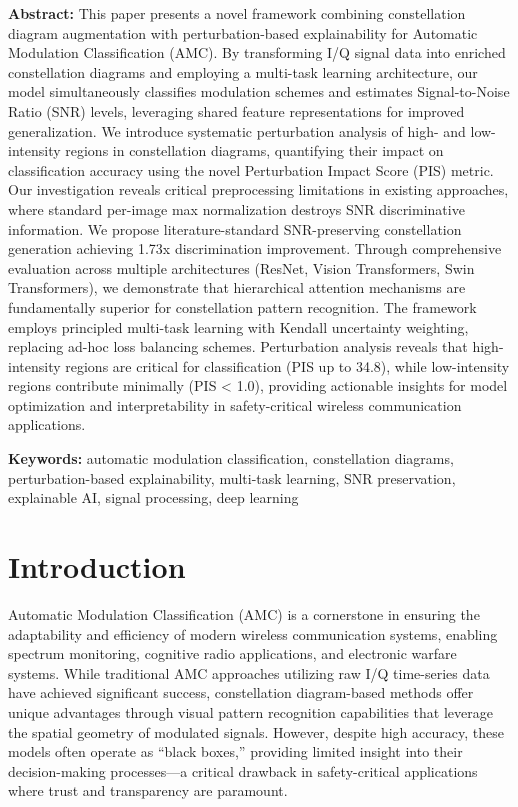 \documentclass{ELSP}
\begin{document}
\noindent\textbf{\textbf{\textcolor[RGB]{0,131,255}{Abstract:}}} This paper presents a novel framework combining constellation diagram augmentation with perturbation-based explainability for Automatic Modulation Classification (AMC). By transforming I/Q signal data into enriched constellation diagrams and employing a multi-task learning architecture, our model simultaneously classifies modulation schemes and estimates Signal-to-Noise Ratio (SNR) levels, leveraging shared feature representations for improved generalization. We introduce systematic perturbation analysis of high- and low-intensity regions in constellation diagrams, quantifying their impact on classification accuracy using the novel Perturbation Impact Score (PIS) metric. Our investigation reveals critical preprocessing limitations in existing approaches, where standard per-image max normalization destroys SNR discriminative information. We propose literature-standard SNR-preserving constellation generation achieving 1.73x discrimination improvement. Through comprehensive evaluation across multiple architectures (ResNet, Vision Transformers, Swin Transformers), we demonstrate that hierarchical attention mechanisms are fundamentally superior for constellation pattern recognition. The framework employs principled multi-task learning with Kendall uncertainty weighting, replacing ad-hoc loss balancing schemes. Perturbation analysis reveals that high-intensity regions are critical for classification (PIS up to 34.8), while low-intensity regions contribute minimally (PIS < 1.0), providing actionable insights for model optimization and interpretability in safety-critical wireless communication applications.

\noindent\textbf{\textcolor[RGB]{0,131,255}{Keywords:}} automatic modulation classification, constellation diagrams, perturbation-based explainability, multi-task learning, SNR preservation, explainable AI, signal processing, deep learning

\section{Introduction}

Automatic Modulation Classification (AMC) is a cornerstone in ensuring the adaptability and efficiency of modern wireless communication systems, enabling spectrum monitoring, cognitive radio applications, and electronic warfare systems. While traditional AMC approaches utilizing raw I/Q time-series data have achieved significant success, constellation diagram-based methods offer unique advantages through visual pattern recognition capabilities that leverage the spatial geometry of modulated signals. However, despite high accuracy, these models often operate as ``black boxes,'' providing limited insight into their decision-making processes—a critical drawback in safety-critical applications where trust and transparency are paramount.
\end{document}
